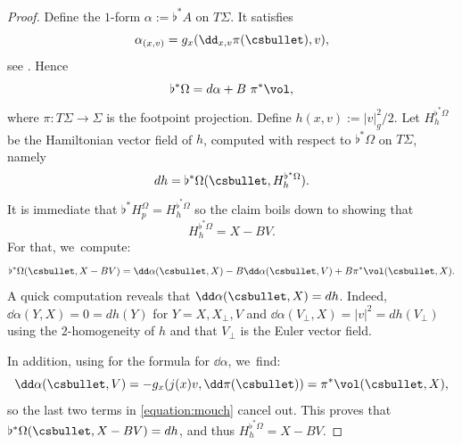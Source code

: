 \begin{proof}
Define the $1$-form $\alpha := \flat^*A$ on $T\Sigma$. It satisfies
\[
\alpha_{(x,v)} = g_x(\dd_{x,v}\pi(\csbullet),v),
\]
see \cite[Lem.\,1.37, item\,1]{Paternain-99}. Hence
\[
\flat^*\Omega = d\alpha + B~ \pi^*\vol,
\]
where $\pi : T\Sigma \to \Sigma$ is the footpoint projection. Define $h(x,v) := |v|^2_g/2$. Let $H_h^{\flat^*\Omega}$ be the Hamiltonian vector field of $h$, computed with respect to $\flat^*\Omega$ on $T\Sigma$, namely
\[
dh = \flat^*\Omega(\csbullet, H_h^{\flat^*\Omega}).
\]
It is immediate that $\flat^* H_p^{\Omega} = H_h^{\flat^*\Omega}$ so the claim boils down to showing that
\[
H_h^{\flat^*\Omega} = X - B V.
\]
For that, we~compute:
\begin{equation}
\label{equation:mouch}
\flat^*\Omega(\csbullet,X-BV) = \dd\alpha(\csbullet, X) - B \dd \alpha(\csbullet, V) + B \pi^*\vol(\csbullet, X).
\end{equation}
A quick computation reveals that $\dd \alpha(\csbullet, X) = dh$. Indeed, $\dd \alpha(Y,X) = 0 = dh(Y)$ for $Y = X,X_\perp,V$ and $\dd \alpha(V_\perp,X) = |v|^2 = dh(V_\perp)$ using the $2$-homogeneity of $h$ and that $V_\perp$ is the Euler vector field.

In addition, using \cite[Prop.\,1.24]{Paternain-99} for the formula for $\dd \alpha$, we~find:
\[
\dd \alpha(\csbullet,V) = - g_x(j(x)v, \dd \pi(\csbullet)) = \pi^*\vol(\csbullet,X),
\]
so the last two terms in \eqref{equation:mouch} cancel out. This proves that $\flat^*\Omega(\csbullet,X-BV) = dh$, and thus $H_h^{\flat^*\Omega} = X - B V$.
\end{proof}
